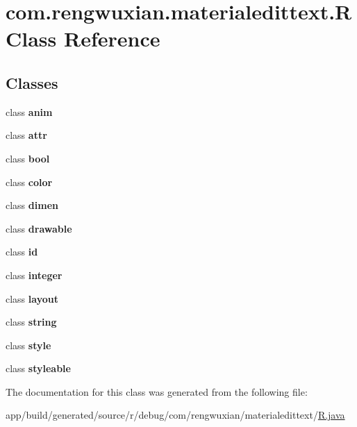 \hypertarget{classcom_1_1rengwuxian_1_1materialedittext_1_1_r}{}\section{com.\+rengwuxian.\+materialedittext.\+R Class Reference}
\label{classcom_1_1rengwuxian_1_1materialedittext_1_1_r}
\subsection*{Classes}
\begin{DoxyCompactItemize}
\item 
class {\bfseries anim}
\item 
class {\bfseries attr}
\item 
class {\bfseries bool}
\item 
class {\bfseries color}
\item 
class {\bfseries dimen}
\item 
class {\bfseries drawable}
\item 
class {\bfseries id}
\item 
class {\bfseries integer}
\item 
class {\bfseries layout}
\item 
class {\bfseries string}
\item 
class {\bfseries style}
\item 
class {\bfseries styleable}
\end{DoxyCompactItemize}


The documentation for this class was generated from the following file\+:\begin{DoxyCompactItemize}
\item 
app/build/generated/source/r/debug/com/rengwuxian/materialedittext/\hyperlink{app_2build_2generated_2source_2r_2debug_2com_2rengwuxian_2materialedittext_2_r_8java}{R.\+java}\end{DoxyCompactItemize}

